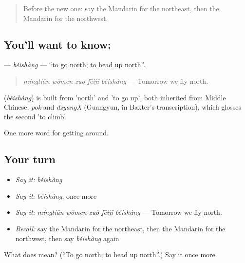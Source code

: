 \label{lesson:ZH-C422-beishang}



\begin{quote}
Before the new one: say the Mandarin for the northeast, then the Mandarin for the northwest.
\end{quote}

\subsection*{You'll want to know: }
\textbf{} — \emph{běishàng} — \textquotedblleft{}to go north; to head up north\textquotedblright{}.

\begin{quote}
\textbf{} \emph{míngtiān wǒmen zuò fēijī běishàng} — Tomorrow we fly north.
\end{quote}

\begin{cousinweb}
\textbf{} (\emph{běishàng}) is built from  'north' and  'to go up', both inherited from Middle Chinese, \emph{pok} and \emph{dzyangX} (Guangyun, in Baxter's transcription), which glosses the second 'to climb'.
\end{cousinweb}

\begin{grammarlens}[title={What you've built}]
One more word for getting around.
\end{grammarlens}

\subsection*{Your turn}
\begin{itemize}
\raggedright
  \item \emph{Say it:} \emph{běishàng}
  \item \emph{Say it:} \emph{běishàng}, once more
  \item \emph{Say it:} \emph{míngtiān wǒmen zuò fēijī běishàng} — Tomorrow we fly north.
  \item \emph{Recall:} say the Mandarin for the northeast, then the Mandarin for the northwest, then say \emph{běishàng} again
\end{itemize}

\begin{tcolorbox}[breakable,colback=teal!4,colframe=teal!35!black,title={Before you move on}]
What does  mean? (\textquotedblleft{}To go north; to head up north\textquotedblright{}.) Say it once more.
\end{tcolorbox}
